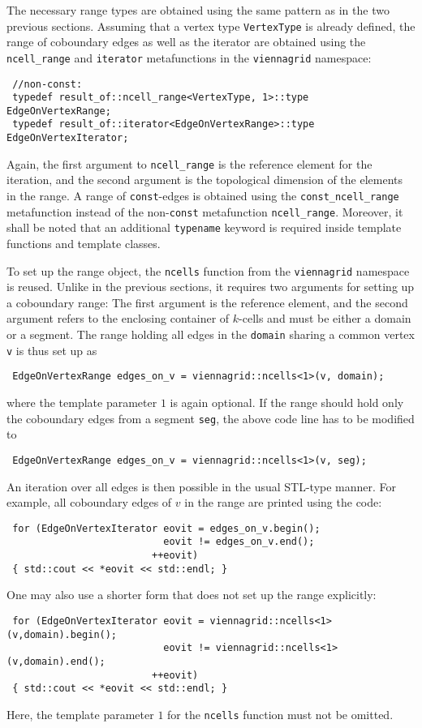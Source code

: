 The necessary range types are obtained using the same pattern as in the two previous sections.
Assuming that a vertex type \lstinline|VertexType| is already defined, the range of coboundary edges as well as the iterator are obtained
using the \lstinline|ncell_range| and \lstinline|iterator| metafunctions in the \lstinline|viennagrid| namespace:
\begin{lstlisting}
 //non-const:
 typedef result_of::ncell_range<VertexType, 1>::type  EdgeOnVertexRange;
 typedef result_of::iterator<EdgeOnVertexRange>::type EdgeOnVertexIterator;
\end{lstlisting}
Again, the first argument to \lstinline|ncell_range| is the reference element for the iteration, and the second argument is the topological dimension of the elements in the range.
A range of \lstinline|const|-edges is obtained using the \lstinline|const_ncell_range| metafunction instead of the non-\lstinline|const| metafunction \lstinline|ncell_range|.
Moreover, it shall be noted that an additional \lstinline|typename| keyword is required inside template functions and template classes.

To set up the range object, the \lstinline|ncells| function from the \lstinline|viennagrid| namespace is reused. Unlike in the previous sections, it requires two arguments
for setting up a coboundary range: The first argument is the reference element, and the second argument refers to the enclosing container of $k$-cells and must be either a domain or a segment.
The range holding all edges in the \lstinline|domain| sharing a common vertex \lstinline|v| is thus set up as
\begin{lstlisting}
 EdgeOnVertexRange edges_on_v = viennagrid::ncells<1>(v, domain);
\end{lstlisting}
where the template parameter $1$ is again optional.
If the range should hold only the coboundary edges from a segment \lstinline|seg|, the above code line has to be modified to
\begin{lstlisting}
 EdgeOnVertexRange edges_on_v = viennagrid::ncells<1>(v, seg);
\end{lstlisting}
An iteration over all edges is then possible in the usual STL-type manner. For example, all coboundary edges of $v$ in the range are printed using the code:
\begin{lstlisting}
 for (EdgeOnVertexIterator eovit = edges_on_v.begin();
                           eovit != edges_on_v.end();
                         ++eovit)
 { std::cout << *eovit << std::endl; }
\end{lstlisting}
One may also use a shorter form that does not set up the range explicitly:
\begin{lstlisting}
 for (EdgeOnVertexIterator eovit = viennagrid::ncells<1>(v,domain).begin();
                           eovit != viennagrid::ncells<1>(v,domain).end();
                         ++eovit)
 { std::cout << *eovit << std::endl; }
\end{lstlisting}
Here, the template parameter $1$ for the \lstinline|ncells| function must not be omitted.

